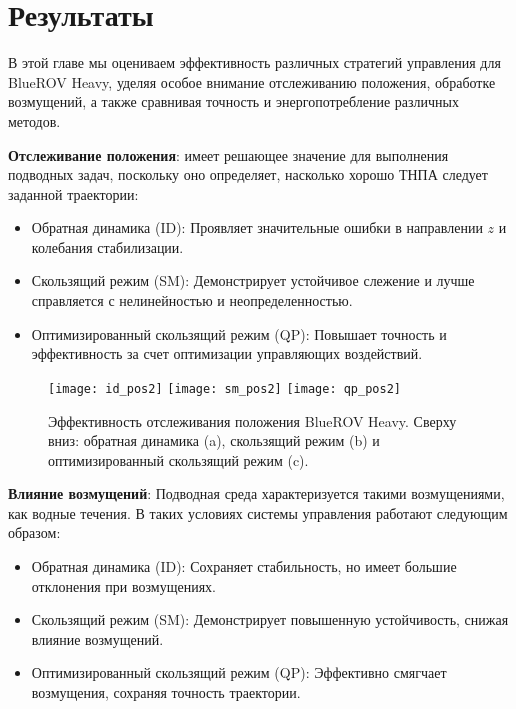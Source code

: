 \chapter{Результаты}
\label{chap:impl}

В этой главе мы оцениваем эффективность различных стратегий управления для BlueROV Heavy, уделяя особое внимание отслеживанию положения, обработке возмущений, а также сравнивая точность и энергопотребление различных методов.

\textbf{Отслеживание положения}: имеет решающее значение для выполнения подводных задач, поскольку оно определяет, насколько хорошо ТНПА следует заданной траектории:
\begin{itemize}
    \item Обратная динамика (ID): Проявляет значительные ошибки в направлении $z$ и колебания стабилизации.
    \item Скользящий режим (SM): Демонстрирует устойчивое слежение и лучше справляется с нелинейностью и неопределенностью.
    \item Оптимизированный скользящий режим (QP): Повышает точность и эффективность за счет оптимизации управляющих воздействий.
\end{itemize}

\begin{figure}[h]
    \centering
    \texttt{[image: id\_pos2]}
    \texttt{[image: sm\_pos2]}
    \texttt{[image: qp\_pos2]}
    \caption{Эффективность отслеживания положения BlueROV Heavy. Сверху вниз: обратная динамика (a), скользящий режим (b) и оптимизированный скользящий режим (c).}
    \label{image:pos_tracking}
\end{figure}

\textbf{Влияние возмущений}: Подводная среда характеризуется такими возмущениями, как водные течения. В таких условиях системы управления работают следующим образом:
\begin{itemize}
    \item Обратная динамика (ID): Сохраняет стабильность, но имеет большие отклонения при возмущениях.
    \item Скользящий режим (SM): Демонстрирует повышенную устойчивость, снижая влияние возмущений.
    \item Оптимизированный скользящий режим (QP): Эффективно смягчает возмущения, сохраняя точность траектории.
\end{itemize}

